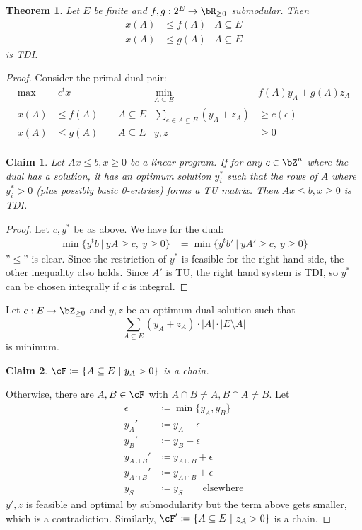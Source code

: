 \documentclass[11pt, a4paper]{article}
\newcommand{\abs}[1]{\left\lvert#1\right\rvert}
\newcommand{\set}[1]{\{#1\}}
\newtheorem{theorem}{Theorem}[section]
\newtheorem*{claim}{Claim}
\theoremstyle{remark}
\theoremstyle{definition}
\begin{document}
\begin{theorem}\label{thm:submodular-ineq-tdi}
	Let $E$ be finite and $f,g: 2^E\to\bR_{\geq0}$ submodular. Then
	\begin{align*}
		x(A) & \leq f(A) & A\subseteq E \\
		x(A) & \leq g(A) & A\subseteq E
	\end{align*}
	is TDI.
\end{theorem}
\begin{proof}
	Consider the primal-dual pair:
	\begin{align*}
		\max & \ c^tx                        & \min_{A\subseteq E}               & f(A)y_A + g(A)z_A \\
		x(A) & \leq f(A) \qquad A\subseteq E & \sum_{e\in A\subseteq E}(y_A+z_A) & \geq c(e)         \\
		x(A) & \leq g(A) \qquad A\subseteq E & y,z                               & \geq0             \\
	\end{align*}
	\begin{claim}
		Let $Ax\leq b, x\geq0$ be a linear program. If for any $c\in\bZ^n$ where
		the dual has a solution, it has an optimum solution $y_i^*$ such that the rows
		of $A$ where $y_i^*>0$ (plus possibly basic 0-entries)
		forms a TU matrix. Then $Ax\leq b, x\geq0$ is TDI.
	\end{claim}
	\begin{proof}
		Let $c,y^*$ be as above. We have for the dual:
		\begin{align*}
			\min\set{y^tb\ |\ yA\geq c,\ y\geq0} & =\min\set{y^tb'\ |\ yA'\geq c,\ y\geq0}
		\end{align*}
		''$\leq$'' is clear. Since the restriction of $y^*$ is feasible for the
		right hand side, the other inequality also holds. Since $A'$ is TU,
		the right hand system is TDI, so $y^*$ can be chosen integrally if $c$
		is integral.
	\end{proof}
	Let $c: E\to\bZ_{\geq0}$ and $y,z$ be an optimum dual solution such that
	\[\sum_{A\subseteq E}(y_A+z_A)\cdot\abs{A}\cdot\abs{E\setminus A}\]
	is minimum.
	\begin{claim}
		$\cF\coloneqq \set{A\subseteq E\ |\ y_A>0}$ is a chain.
	\end{claim}
	Otherwise, there are $A,B\in\cF$ with $A\cap B\neq A, B\cap A\neq B$. Let
	\begin{align*}
		\epsilon     & \coloneqq \min\set{y_A,y_B}          \\
		y_A'         & \coloneqq y_A-\epsilon               \\
		y_B'         & \coloneqq y_B-\epsilon               \\
		y_{A\cup B}' & \coloneqq y_{A\cup B}+\epsilon       \\
		y_{A\cap B}' & \coloneqq y_{A\cap B}+\epsilon       \\
		y_S          & \coloneqq y_S \qquad\text{elsewhere}
	\end{align*}
	$y',z$ is feasible and optimal by submodularity but the term above gets
	smaller, which is a contradiction. Similarly, $\cF'\coloneqq \set{A\subseteq
			E\ |\ z_A>0}$ is a chain.


\end{proof}
\end{document}
